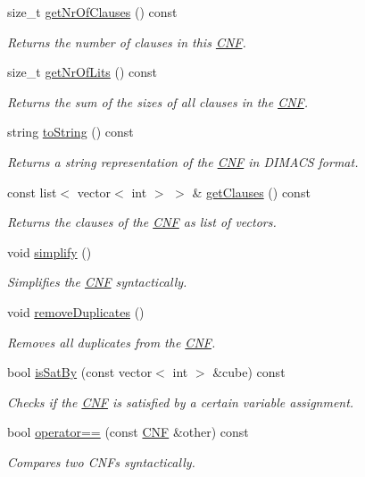 \begin{DoxyCompactItemize}
size\-\_\-t \hyperlink{classCNF_ad0bf994acbde601aa482f3d94ef1cb71}{get\-Nr\-Of\-Clauses} () const 
\begin{DoxyCompactList}\small\item\em Returns the number of clauses in this \hyperlink{classCNF}{C\-N\-F}. \end{DoxyCompactList}\item 
size\-\_\-t \hyperlink{classCNF_a4fafd0324a1c4c7f345b8df7f931aafa}{get\-Nr\-Of\-Lits} () const 
\begin{DoxyCompactList}\small\item\em Returns the sum of the sizes of all clauses in the \hyperlink{classCNF}{C\-N\-F}. \end{DoxyCompactList}\item 
string \hyperlink{classCNF_ae15ec06cc22d6cda868febd1708d331b}{to\-String} () const 
\begin{DoxyCompactList}\small\item\em Returns a string representation of the \hyperlink{classCNF}{C\-N\-F} in D\-I\-M\-A\-C\-S format. \end{DoxyCompactList}\item 
const list$<$ vector$<$ int $>$ $>$ \& \hyperlink{classCNF_a9532acac619c098668460a4c97cbbc0f}{get\-Clauses} () const 
\begin{DoxyCompactList}\small\item\em Returns the clauses of the \hyperlink{classCNF}{C\-N\-F} as list of vectors. \end{DoxyCompactList}\item 
void \hyperlink{classCNF_a7a3345272f6c5332aa5118e80284f61f}{simplify} ()
\begin{DoxyCompactList}\small\item\em Simplifies the \hyperlink{classCNF}{C\-N\-F} syntactically. \end{DoxyCompactList}\item 
void \hyperlink{classCNF_a08cf05fc87ad59d65b0b03d8d3f61029}{remove\-Duplicates} ()
\begin{DoxyCompactList}\small\item\em Removes all duplicates from the \hyperlink{classCNF}{C\-N\-F}. \end{DoxyCompactList}\item 
bool \hyperlink{classCNF_ac0fc121fe92bc190aeeaf351703fe111}{is\-Sat\-By} (const vector$<$ int $>$ \&cube) const 
\begin{DoxyCompactList}\small\item\em Checks if the \hyperlink{classCNF}{C\-N\-F} is satisfied by a certain variable assignment. \end{DoxyCompactList}\item 
bool \hyperlink{classCNF_a5ce0741b551948faff1d3365871b2218}{operator==} (const \hyperlink{classCNF}{C\-N\-F} \&other) const 
\begin{DoxyCompactList}\small\item\em Compares two C\-N\-Fs syntactically. \end{DoxyCompactList}\end{DoxyCompactItemize}
